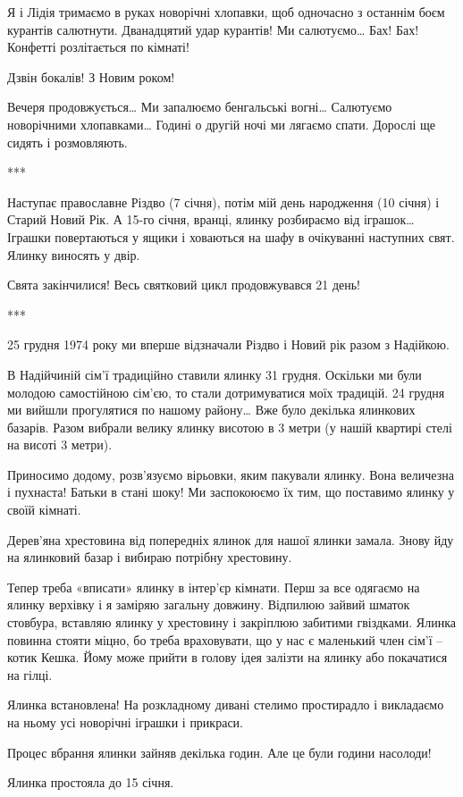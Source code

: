Я і Лідія тримаємо в руках новорічні хлопавки, щоб одночасно з останнім боєм
курантів салютнути. Дванадцятий удар курантів! Ми салютуємо… Бах! Бах! Конфетті
розлітається по кімнаті! 

Дзвін бокалів! З Новим роком! 

Вечеря продовжується… Ми запалюємо бенгальські вогні… Салютуємо новорічними
хлопавками… Годині о другій ночі ми лягаємо спати. Дорослі ще сидять і
розмовляють.

***

Наступає православне Різдво (7 січня), потім мій день народження (10 січня) і
Старий Новий Рік. А 15-го січня, вранці, ялинку розбираємо від іграшок… Іграшки
повертаються у ящики і ховаються на шафу в очікуванні наступних свят. Ялинку
виносять у двір.

Свята закінчилися! Весь святковий цикл продовжувався 21 день!

***

25 грудня 1974 року ми вперше відзначали Різдво і Новий рік разом з Надійкою. 

В Надійчиній сім’ї традиційно ставили ялинку 31 грудня. Оскільки ми були
молодою самостійною сім’єю, то стали дотримуватися моїх традицій. 24 грудня ми
вийшли прогулятися по нашому району… Вже було декілька ялинкових базарів. Разом
вибрали велику ялинку висотою в 3 метри (у нашій квартирі стелі на висоті 3
метри). 

Приносимо додому, розв’язуємо вірьовки, яким пакували ялинку. Вона величезна і
пухнаста! Батьки в стані шоку! Ми заспокоюємо їх тим, що поставимо ялинку у
своїй кімнаті.

Дерев’яна хрестовина від попередніх ялинок для нашої ялинки замала. Знову йду
на ялинковий базар і вибираю потрібну хрестовину. 

Тепер треба «вписати» ялинку в інтер’єр кімнати. Перш за все одягаємо на ялинку
верхівку і я заміряю загальну довжину. Відпилюю зайвий шматок стовбура,
вставляю ялинку у хрестовину і закріплюю забитими гвіздками. Ялинка повинна
стояти міцно, бо треба враховувати, що у нас є маленький член сім’ї – котик
Кешка. Йому може прийти в голову ідея залізти на ялинку або покачатися на
гілці. 

Ялинка встановлена! На розкладному дивані стелимо простирадло і викладаємо на
ньому усі новорічні іграшки і прикраси. 

Процес вбрання ялинки зайняв декілька годин. Але це були години насолоди!

Ялинка простояла до 15 січня.

